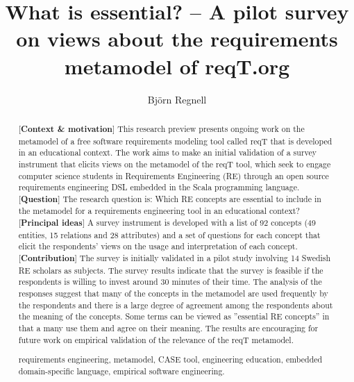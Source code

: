 \documentclass[a4paper]{llncs}
\newcommand{\keywords}[1]{\par\addvspace\baselineskip
\noindent\keywordname\enspace\ignorespaces#1}
\begin{document}

\mainmatter  %

\title{What is essential? -- A pilot survey on views about the requirements metamodel of reqT.org}


\author{Bj\"orn Regnell}
%


\maketitle

\begin{abstract}
[{\bf Context \& motivation}] This research preview presents ongoing work on the metamodel of a free software requirements modeling tool called reqT that is developed in an educational context. The work aims to make an initial validation of a survey instrument that elicits views on the metamodel of the reqT tool, which seek to engage computer science students in Requirements Engineering (RE) through an open source requirements engineering DSL embedded in the Scala programming language. [{\bf Question}] The research question is: Which RE concepts are essential to include in the metamodel for a requirements engineering tool in an educational context?  [{\bf Principal ideas}] A survey instrument is developed with a list of 92 concepts (49 entities, 15 relations and 28 attributes) and a set of questions for each concept that elicit the respondents' views on the usage and interpretation of each concept.  [{\bf Contribution}] The survey is initially validated in a pilot study involving 14 Swedish RE scholars as subjects. The survey results indicate that the survey is feasible if the respondents is willing to invest around 30 minutes of their time. The analysis of the responses suggest that many of the concepts in the metamodel are used frequently by the respondents and there is a large degree of agreement among the respondents about the meaning of the concepts. Some terms can be viewed as ''essential RE concepts'' in that a many use them and agree on their meaning. The results are encouraging for future work on empirical validation of the relevance of the reqT metamodel. 

\keywords{requirements engineering, metamodel, CASE tool, engineering education, embedded domain-specific language, empirical software engineering.}
\end{abstract}
\end{document}

